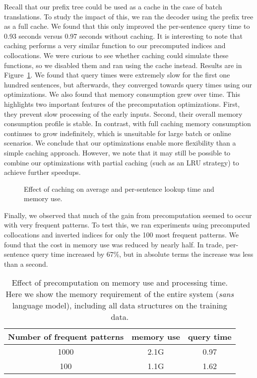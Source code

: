 Recall that our prefix tree could be used as a cache in the
case of batch translations.  To study the impact of this,
we ran the decoder using the prefix tree as a full cache.
We found that this only improved the per-sentence query
time to 0.93 seconds versus 0.97 seconds without caching.
It is interesting to note that caching performs a very
similar function to our precomputed indices and collocations.
We were curious to see whether caching could simulate these
functions, so we disabled them and ran using the cache instead.
Results are in Figure~\ref{fig:caching-results}.  We
found that query times were extremely slow for the first
one hundred sentences, but afterwards, they converged
towards query times using our optimizations.  We also
found that memory consumption grew over time.
This highlights two important features of the 
precomputation optimizations.
First, they prevent slow processing of the early inputs.  
Second, their overall memory consumption profile is stable.  In 
contrast, with full caching memory consumption continues to grow
indefinitely, which is unsuitable for large batch
or online scenarios.  We conclude that our optimizations
enable more flexibility than a simple caching approach.  However,
we note that it may still be possible to combine our optimizations
with partial caching (such as an LRU strategy) to achieve further
speedups.

\figpreamble
\begin{figure}
	\begin{center}
		
	\end{center}
	\figpostamble
	\caption{Effect of caching on average and per-sentence lookup time and memory use.}
	\label{fig:caching-results}
\end{figure}

Finally, we observed that much of the gain from 
precomputation seemed to occur with very frequent patterns.
To test this, we ran experiments using precomputed collocations
and inverted indices for only the 100 most frequent patterns.
We found that the cost in memory use was reduced by nearly half.
In trade, per-sentence query time increased by 67\%, but in
absolute terms the increase was less than a second.

\begin{table}
	\begin{tabular}{ccc}
		Number of frequent patterns & memory use & query time \\ \hline
		1000 & 2.1G & 0.97 \\
		100 & 1.1G & 1.62\\
	\end{tabular}
	\caption[Effect of precomputation on memory use and processing time]
	{Effect of precomputation on memory use and processing time.  Here we show the memory requirement of the entire system ({\em sans} language model), including all data structures on the training data.}
	\label{fig:memory-usage}
\end{table}



